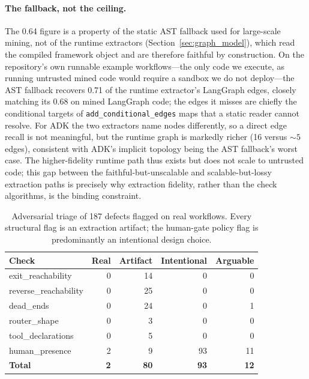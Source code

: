 \paragraph{The fallback, not the ceiling.}
The 0.64 figure is a property of the static AST fallback used for large-scale
mining, not of the runtime extractors (Section~\ref{sec:graph_model}), which read
the compiled framework object and are therefore faithful by construction. On the
repository's own runnable example workflows---the only code we execute, as running
untrusted mined code would require a sandbox we do not deploy---the AST fallback
recovers 0.71 of the runtime extractor's LangGraph edges, closely matching its
0.68 on mined LangGraph code; the edges it misses are chiefly the conditional
targets of \texttt{add\_conditional\_edges} maps that a static reader cannot
resolve. For ADK the two extractors name nodes differently, so a direct edge
recall is not meaningful, but the runtime graph is markedly richer (16 versus
${\sim}5$ edges), consistent with ADK's implicit topology being the AST fallback's
worst case. The higher-fidelity runtime path thus exists but does not scale to
untrusted code; this gap between the faithful-but-unscalable and
scalable-but-lossy extraction paths is precisely why extraction fidelity, rather
than the check algorithms, is the binding constraint.

\begin{table}[t]
\centering
\small
\caption{Adversarial triage of 187 defects flagged on real workflows. Every
structural flag is an extraction artifact; the human-gate policy flag is
predominantly an intentional design choice.}
\label{tab:realworld_triage}
\begin{tabular}{@{}lrrrr@{}}
\toprule
\textbf{Check} & \textbf{Real} & \textbf{Artifact} & \textbf{Intentional} & \textbf{Arguable} \\
\midrule
exit\_reachability     & 0 & 14 & 0  & 0 \\
reverse\_reachability  & 0 & 25 & 0  & 0 \\
dead\_ends             & 0 & 24 & 0  & 1 \\
router\_shape          & 0 & 3  & 0  & 0 \\
tool\_declarations     & 0 & 5  & 0  & 0 \\
human\_presence        & 2 & 9  & 93 & 11 \\
\midrule
\textbf{Total}         & \textbf{2} & \textbf{80} & \textbf{93} & \textbf{12} \\
\bottomrule
\end{tabular}
\end{table}


